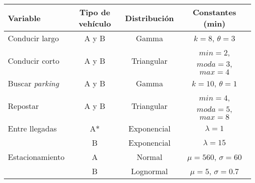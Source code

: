 \documentclass[varwidth=\maxdimen]{standalone}
\begin{document}
\begin{tabular}{ l c c c }
	\toprule
	Variable	& Tipo de vehículo	& Distribución	& Constantes (min) \\
	\midrule
	Conducir largo	& A y B	& Gamma			& $k = 8$, $\theta = 3$ \\
	Conducir corto	& A y B	& Triangular	& $min = 2$, $moda = 3$, $max = 4$ \\
	Buscar \textit{parking}	& A y B	& Gamma			& $k = 10$, $\theta = 1$ \\
	Repostar		& A y B	& Triangular	& $min = 4$, $moda = 5$, $max = 8$ \\
	Entre llegadas	& A*	& Exponencial	& $\lambda = 1$ \\
					& B		& Exponencial	& $\lambda = 15$ \\
	Estacionamiento	& A		& Normal		& $\mu = 560$, $\sigma = 60$ \\
					& B		& Lognormal		& $\mu = 5$, $\sigma = 0.7$ \\
	\bottomrule
\end{tabular}
\end{document}
